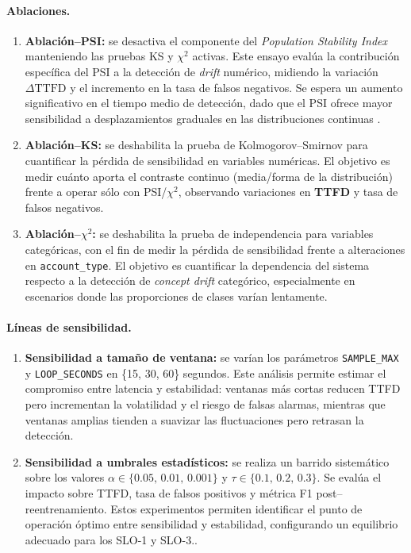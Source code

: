 \paragraph{Ablaciones.}
\begin{enumerate}
  \item \textbf{Ablación–PSI:} se desactiva el componente del \textit{Population Stability Index} manteniendo las pruebas KS y $\chi^2$ activas.  
  Este ensayo evalúa la contribución específica del PSI a la detección de \textit{drift} numérico, midiendo la variación $\Delta \text{TTFD}$ y el incremento en la tasa de falsos negativos. Se espera un aumento significativo en el tiempo medio de detección, dado que el PSI ofrece mayor sensibilidad a desplazamientos graduales en las distribuciones continuas \citep{Sethi2017,Lu2019}.
  
  \item \textbf{Ablación–KS:} se deshabilita la prueba de Kolmogorov–Smirnov para cuantificar la pérdida de sensibilidad en variables numéricas. El objetivo es medir cuánto aporta el contraste continuo (media/forma de la distribución) frente a operar sólo con PSI/$\chi^2$, observando variaciones en \textbf{TTFD} y tasa de falsos negativos.
  
  \item \textbf{Ablación–$\chi^2$:} se deshabilita la prueba de independencia para variables categóricas, con el fin de medir la pérdida de sensibilidad frente a alteraciones en \texttt{account\_type}.  
  El objetivo es cuantificar la dependencia del sistema respecto a la detección de \textit{concept drift} categórico, especialmente en escenarios donde las proporciones de clases varían lentamente.
\end{enumerate}

\paragraph{Líneas de sensibilidad.}
\begin{enumerate}
  \item \textbf{Sensibilidad a tamaño de ventana:} se varían los parámetros \texttt{SAMPLE\_MAX} y \texttt{LOOP\_SECONDS} en \{15, 30, 60\} segundos.  
  Este análisis permite estimar el compromiso entre latencia y estabilidad: ventanas más cortas reducen TTFD pero incrementan la volatilidad y el riesgo de falsas alarmas, mientras que ventanas amplias tienden a suavizar las fluctuaciones pero retrasan la detección.

  \item \textbf{Sensibilidad a umbrales estadísticos:} se realiza un barrido sistemático sobre los valores $\alpha \in \{0.05,\,0.01,\,0.001\}$ y $\tau \in \{0.1,\,0.2,\,0.3\}$.  
  Se evalúa el impacto sobre TTFD, tasa de falsos positivos y métrica F1 post–reentrenamiento.  
  Estos experimentos permiten identificar el punto de operación óptimo entre sensibilidad y estabilidad, configurando un equilibrio adecuado para los SLO-1 y SLO-3..
\end{enumerate}

